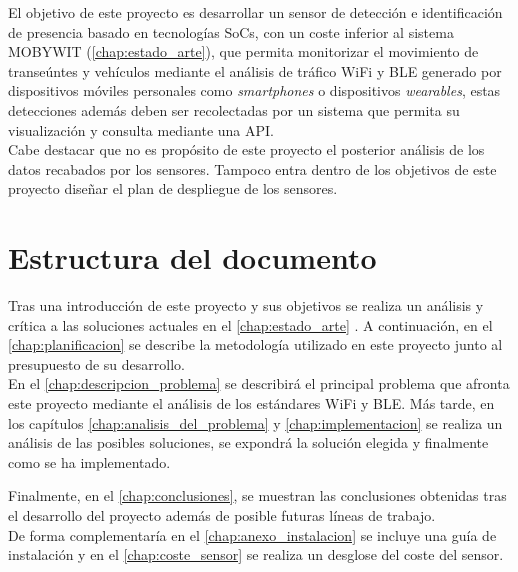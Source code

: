 \documentclass[../proyecto.tex]{subfiles}
\begin{document}
El objetivo de este proyecto es desarrollar un sensor de detección e identificación de presencia basado en tecnologías SoCs, con un coste inferior al sistema MOBYWIT (\autoref{chap:estado_arte}), que permita monitorizar el movimiento de transeúntes y vehículos mediante el análisis de tráfico WiFi y BLE generado por dispositivos móviles personales como \textit{smartphones} o dispositivos \textit{wearables}, estas detecciones además deben ser recolectadas por un sistema que permita su visualización y consulta mediante una API.\\

Cabe destacar que no es propósito de este proyecto el posterior análisis de los datos recabados por los sensores. Tampoco entra dentro de los objetivos de este proyecto diseñar el plan de despliegue de los sensores.\\

\section{Estructura del documento}

 Tras una introducción de este proyecto y sus objetivos se realiza un análisis y crítica a las soluciones actuales en el \autoref{chap:estado_arte} . A continuación, en el \autoref{chap:planificacion} se describe la metodología utilizado en este proyecto junto al presupuesto de su desarrollo.\\

En el \autoref{chap:descripcion_problema} se describirá el principal problema que afronta este proyecto mediante el análisis de los estándares WiFi y BLE. Más tarde, en los capítulos \autoref{chap:analisis_del_problema} y \autoref{chap:implementacion} se realiza un análisis de las posibles soluciones, se expondrá la solución elegida y finalmente como se ha implementado.

Finalmente, en el \autoref{chap:conclusiones}, se muestran las conclusiones obtenidas tras el desarrollo del proyecto además de posible futuras líneas de trabajo.\\

De forma complementaría en el  \autoref{chap:anexo_instalacion} se incluye una guía de instalación y en el \autoref{chap:coste_sensor} se realiza un desglose del coste del sensor.\\
\end{document}
